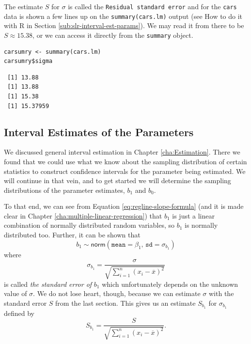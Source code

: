 \documentclass[captions=tableheading]{scrbook}
\begin{document}
The estimate \(S\) for \(\sigma\) is called the \texttt{Residual standard error} and for the \texttt{cars} data is shown a few lines up on the \texttt{summary(cars.lm)} output (see How to do it with \textsf{R} in Section \ref{sub:slr-interval-est-params}). We may read it from there to be \( S\approx  15.38 \), or we can access it directly from the \texttt{summary} object.


\begin{verbatim}
carsumry <- summary(cars.lm)
carsumry$sigma
\end{verbatim}

\begin{verbatim}
 [1] 13.88
 [1] 13.88
 [1] 15.38
 [1] 15.37959
\end{verbatim}
\subsection{Interval Estimates of the Parameters}
\label{sec-11-2-4}

\label{sub:slr-interval-est-params}

We discussed general interval estimation in Chapter \ref{cha:Estimation}. There we found that we could use what we know about the sampling distribution of certain statistics to construct confidence intervals for the parameter being estimated. We will continue in that vein, and to get started we will determine the sampling distributions of the parameter estimates, \(b_{1}\) and \(b_{0}\).

To that end, we can see from Equation \ref{eq:regline-slope-formula} (and it is made clear in Chapter \ref{cha:multiple-linear-regression}) that \(b_{1}\) is just a linear combination of normally distributed random variables, so \(b_{1}\) is normally distributed too. Further, it can be shown that
\begin{equation}
b_{1}\sim\mathsf{norm}\left(\mathtt{mean}=\beta_{1},\,\mathtt{sd}=\sigma_{b_{1}}\right)
\end{equation}
where
\begin{equation}
\sigma_{b_{1}}=\frac{\sigma}{\sqrt{\sum_{i=1}^{n}(x_{i}-\overline{x})^{2}}}
\end{equation}
is called \emph{the standard error of} \(b_{1}\) which unfortunately depends on the unknown value of \(\sigma\). We do not lose heart, though, because we can estimate \(\sigma\) with the standard error \(S\) from the last section. This gives us an estimate \(S_{b_{1}}\) for \(\sigma_{b_{1}}\) defined by
\begin{equation}
S_{b_{1}}=\frac{S}{\sqrt{\sum_{i=1}^{n}(x_{i}-\overline{x})^{2}}}.
\end{equation}
\end{document}
